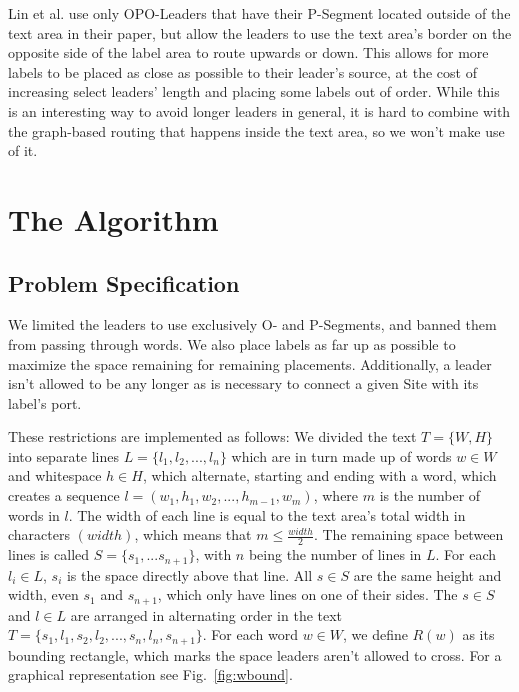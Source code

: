 \documentclass[11pt,a4paper]{vutinfth}
\begin{document}
Lin et al.\cite{Lin2009} use only OPO-Leaders that have their P-Segment located outside of the text area in their paper, but allow the leaders to use the text area's border on the opposite side of the label area to route upwards or down. This allows for more labels to be placed as close as possible to their leader's source, at the cost of increasing select leaders' length and placing some labels out of order. While this is an interesting way to avoid longer leaders in general, it is hard to combine with the graph-based routing that happens inside the text area, so we won't make use of it.


\chapter{The Algorithm}
\section{Problem Specification}
\label{sec:ProbSpec}
We limited the leaders to use exclusively O- and P-Segments, and banned them from passing through words. We also place labels as far up as possible to maximize the space remaining for  remaining placements. Additionally, a leader isn't allowed to be any longer as is necessary to connect a given Site with its label's port.

These restrictions are implemented as follows: We divided the text $T=\{W,H\}$ into separate lines $L=\{l_1 ,l_2 , ... ,l_n\}$ which are in turn made up of words $w \in W$ and whitespace $h \in H$, which alternate, starting and ending with a word, which creates a sequence $l=(w_1,h_1,w_2, ... , h_{m-1},w_m)$, where $m$ is the number of words in $l$. The width of each line is equal to the text area's total width in characters $(width)$, which means that $m \leq \frac{width}{2}$. The remaining space between lines is called $S=\{s_1, ... s_{n+1}\}$, with $n$ being the number of lines in $L$. For each $l_i \in L$,  $s_i$ is the space directly above that line. All $s \in S$ are the same height and width, even $s_1$ and $s_{n+1}$, which only have lines on one of their sides. The $s \in S$ and $l \in L$ are arranged in alternating order in the text $T=\{s_1, l_1, s_2, l_2, ..., s_n, l_n, s_{n+1}\}$.  For each word $w \in W$, we define $R(w)$  as its bounding rectangle, which marks the space leaders aren't allowed to cross. For a graphical representation see Fig.~\ref*{fig:wbound}.
\end{document}
